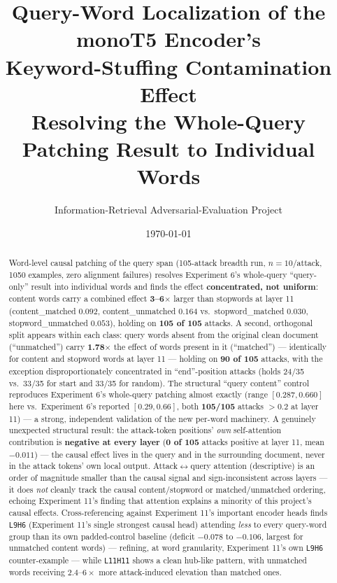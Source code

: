 \documentclass[11pt]{article}
\title{\textbf{Query-Word Localization of the monoT5 Encoder's \\[2pt]
Keyword-Stuffing Contamination Effect} \\[6pt]
\large Resolving the Whole-Query Patching Result to Individual Words}
\author{Information-Retrieval Adversarial-Evaluation Project}
\date{\today}
\begin{document}
\maketitle

\begin{abstract}
Word-level causal patching of the query span (105-attack breadth run, $n{=}10$/attack,
1050 examples, zero alignment failures) resolves Experiment 6's whole-query
``query-only'' result into individual words and finds the effect \textbf{concentrated, not
uniform}: content words carry a combined effect \textbf{3--6$\times$} larger than
stopwords at layer 11 (content\_matched $0.092$, content\_unmatched $0.164$ vs.\
stopword\_matched $0.030$, stopword\_unmatched $0.053$), holding on \textbf{105 of 105}
attacks. A second, orthogonal split appears within each class: query words absent from
the original clean document (``unmatched'') carry \textbf{1.78$\times$} the effect of
words present in it (``matched'') — identically for content and stopword words at layer
11 — holding on \textbf{90 of 105} attacks, with the exception disproportionately
concentrated in ``end''-position attacks (holds 24/35 vs.\ 33/35 for start and 33/35 for
random). The structural ``query content'' control reproduces Experiment 6's whole-query
patching almost exactly (range $[0.287, 0.660]$ here vs.\ Experiment 6's reported
$[0.29, 0.66]$, both \textbf{105/105} attacks $>0.2$ at layer 11) — a strong, independent
validation of the new per-word machinery. A genuinely unexpected structural result: the
attack-token positions' \emph{own} self-attention contribution is \textbf{negative at
every layer} (\textbf{0 of 105} attacks positive at layer 11, mean $-0.011$) — the causal
effect lives in the query and in the surrounding document, never in the attack tokens'
own local output. Attack$\leftrightarrow$query attention (descriptive) is an order of
magnitude smaller than the causal signal and sign-inconsistent across layers — it does
\emph{not} cleanly track the causal content/stopword or matched/unmatched ordering,
echoing Experiment 11's finding that attention explains a minority of this project's
causal effects. Cross-referencing against Experiment 11's important encoder heads finds
\texttt{L9H6} (Experiment 11's single strongest causal head) attending \emph{less} to
every query-word group than its own padded-control baseline (deficit $-0.078$ to
$-0.106$, largest for unmatched content words) — refining, at word granularity, Experiment
11's own \texttt{L9H6} counter-example — while \texttt{L11H11} shows a clean hub-like
pattern, with unmatched words receiving $2.4$--$6\times$ more attack-induced elevation
than matched ones.
\end{abstract}
\end{document}
